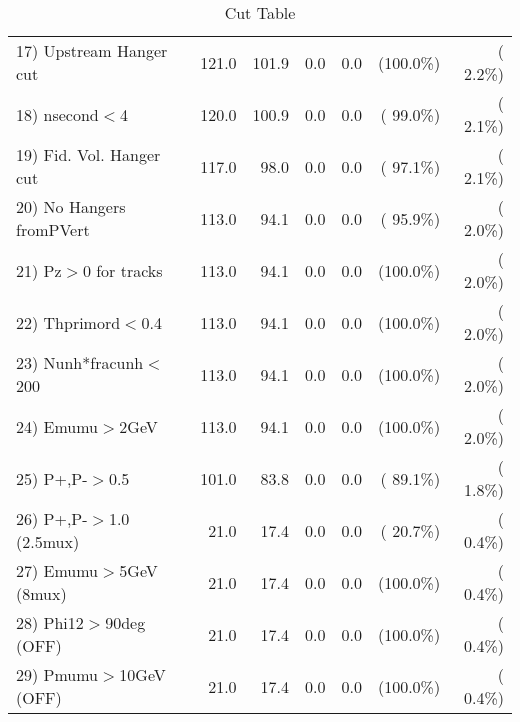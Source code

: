 \begin{table}[h!]
\begin{tabular}{||l||r|r|r|r|r|r||}
 17) Upstream Hanger cut  &        121.0 &        101.9 &          0.0 &          0.0 & (100.0\%) & (  2.2\%) \\
 18) nsecond$<$4          &        120.0 &        100.9 &          0.0 &          0.0 & ( 99.0\%) & (  2.1\%) \\
 19) Fid. Vol. Hanger cut &        117.0 &         98.0 &          0.0 &          0.0 & ( 97.1\%) & (  2.1\%) \\
 20) No Hangers fromPVert &        113.0 &         94.1 &          0.0 &          0.0 & ( 95.9\%) & (  2.0\%) \\
 21) Pz$>$0 for tracks    &        113.0 &         94.1 &          0.0 &          0.0 & (100.0\%) & (  2.0\%) \\
 22) Thprimord$<$0.4      &        113.0 &         94.1 &          0.0 &          0.0 & (100.0\%) & (  2.0\%) \\
 23) Nunh*fracunh$<$200   &        113.0 &         94.1 &          0.0 &          0.0 & (100.0\%) & (  2.0\%) \\
 24) Emumu$>$2GeV         &        113.0 &         94.1 &          0.0 &          0.0 & (100.0\%) & (  2.0\%) \\
 25) P+,P-$>$0.5          &        101.0 &         83.8 &          0.0 &          0.0 & ( 89.1\%) & (  1.8\%) \\
 26) P+,P-$>$1.0 (2.5mux) &         21.0 &         17.4 &          0.0 &          0.0 & ( 20.7\%) & (  0.4\%) \\
 27) Emumu$>$5GeV  (8mux) &         21.0 &         17.4 &          0.0 &          0.0 & (100.0\%) & (  0.4\%) \\
 28) Phi12$>$90deg  (OFF) &         21.0 &         17.4 &          0.0 &          0.0 & (100.0\%) & (  0.4\%) \\
 29) Pmumu$>$10GeV  (OFF) &         21.0 &         17.4 &          0.0 &          0.0 & (100.0\%) & (  0.4\%) \\
 \hline
 \hline
 \end{tabular}
 \caption{Cut Table           }
 \label{tab-cutcohjpsi-mumu_jpsi}
 \end{table}
